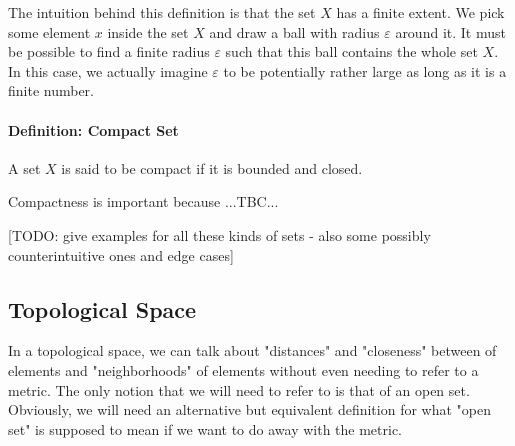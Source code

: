 \medskip
The intuition behind this definition is that the set $X$ has a finite extent. We pick some element $x$ inside the set $X$ and draw a ball with radius $\varepsilon$ around it. It must be possible to find a finite radius $\varepsilon$ such that this ball contains the whole set $X$. In this case, we actually imagine $\varepsilon$ to be potentially rather large as long as it is a finite number.

\paragraph{Definition: Compact Set} A set $X$ is said to be compact if it is bounded and closed.

\medskip
Compactness is important because ...TBC...

[TODO: give examples for all these kinds of sets - also some possibly counterintuitive ones and edge cases]









\subsection{Topological Space}
In a topological space, we can talk about "distances" and "closeness" between of elements and "neighborhoods" of elements without even needing to refer to a metric. The only notion that we will need to refer to is that of an open set. Obviously, we will need an alternative but equivalent definition for what "open set" is supposed to mean if we want to do away with the metric.



